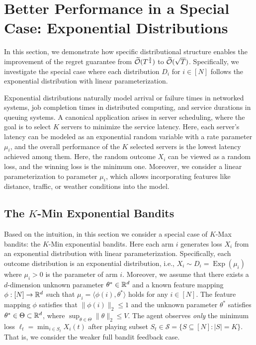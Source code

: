 \section{Better Performance in a Special Case: Exponential Distributions}
\label{sec:kminexp}

\newcommand{\Exp}{\operatorname{Exp}}

In this section, we demonstrate how specific distributional structure enables the improvement of the regret guarantee from $\widetilde{{\mathcal{O}}}(T^{\frac{3}{4}})$ to $\widetilde{{\mathcal{O}}}(\sqrt{T})$. Specifically, we investigate the special case where each distribution $D_i$ for $i \in [N]$ follows the exponential distribution with linear parameterization. 

Exponential distributions naturally model arrival or failure times in networked systems, job completion times in distributed computing, and service durations in queuing systems. 
A canonical application arises in server scheduling, where the goal is to select $K$ servers to minimize the service latency. Here, each server's latency can be modeled as an exponential random variable with a rate parameter $\mu_i$, and the overall performance of the $K$ selected servers is the lowest latency achieved among them. 
%
Here, the random outcome $X_i$ can be viewed as a random loss, and the winning loss is the minimum one. 
Moreover, we consider a linear parameterization to parameter $\mu_i$, which allows incorporating features like distance, traffic, or weather conditions into the model.


\subsection{The $K$-Min Exponential Bandits}

Based on the intuition, in this section we consider a special case of $K$-Max bandits: the $K$-Min exponential bandits.
Here each arm $i$ generates loss $X_i$ from an exponential distribution with linear parameterization. 
%
Specifically, each outcome distribution is an exponential distribution, i.e., $X_i \sim D_i = \Exp(\mu_i)$ where $\mu_i > 0$ is the parameter of arm $i$. Moreover, we assume that there exists a $d$-dimension unknown parameter $\theta^* \in \mathbb{R}^d$ and a known feature mapping $\phi : [N] \to \mathbb{R}^d$ such that $\mu_i = \langle \phi(i), \theta^* \rangle$ holds for any $i \in [N]$. The feature mapping $\phi$ satisfies that $\|\phi(i)\|_2 \le 1$ and the unknown parameter $\theta^*$ satisfies $\theta^* \in \Theta  \subset \mathbb{R}^d$, where $\sup_{\theta \in \Theta} \|\theta\|_2 \le V$.
%
The agent observes \textit{only} the minimum loss $\ell_t = \min_{i \in S_t} X_i(t)$ after playing subset $S_t \in \mathcal{S} = \{S \subseteq [N] : |S| = K\}$.
That is, we consider the weaker full bandit feedback case.

